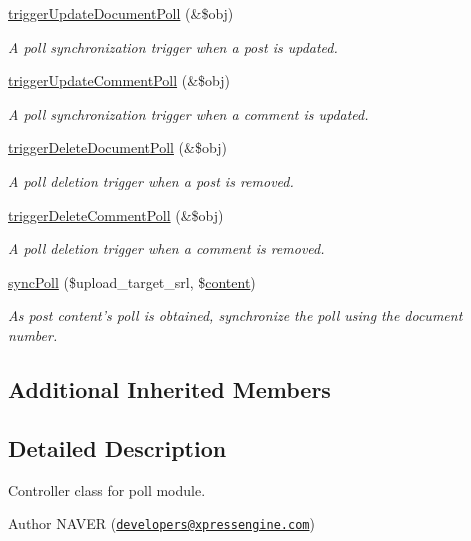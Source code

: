 \begin{DoxyCompactItemize}
\hyperlink{classpollController_a20c5267c985ebf4484a61b238850f0c5}{trigger\+Update\+Document\+Poll} (\&\$obj)
\begin{DoxyCompactList}\small\item\em A poll synchronization trigger when a post is updated. \end{DoxyCompactList}\item 
\hyperlink{classpollController_a2f3da10fbc7dc8bf7dddaf0e81e152ab}{trigger\+Update\+Comment\+Poll} (\&\$obj)
\begin{DoxyCompactList}\small\item\em A poll synchronization trigger when a comment is updated. \end{DoxyCompactList}\item 
\hyperlink{classpollController_ac74ea74fb486787ce4c6c3c9fe3a91da}{trigger\+Delete\+Document\+Poll} (\&\$obj)
\begin{DoxyCompactList}\small\item\em A poll deletion trigger when a post is removed. \end{DoxyCompactList}\item 
\hyperlink{classpollController_abd194582f292d00b57a524453ef256d3}{trigger\+Delete\+Comment\+Poll} (\&\$obj)
\begin{DoxyCompactList}\small\item\em A poll deletion trigger when a comment is removed. \end{DoxyCompactList}\item 
\hyperlink{classpollController_a9a22d9c1e70e7fdf3d635cc4e02fe8f7}{sync\+Poll} (\$upload\+\_\+target\+\_\+srl, \$\hyperlink{classcontent}{content})
\begin{DoxyCompactList}\small\item\em As post content's poll is obtained, synchronize the poll using the document number. \end{DoxyCompactList}\end{DoxyCompactItemize}
\subsection*{Additional Inherited Members}


\subsection{Detailed Description}
Controller class for poll module. 

\begin{DoxyAuthor}{Author}
N\+A\+V\+E\+R (\href{mailto:developers@xpressengine.com}{\tt developers@xpressengine.\+com}) 
\end{DoxyAuthor}


